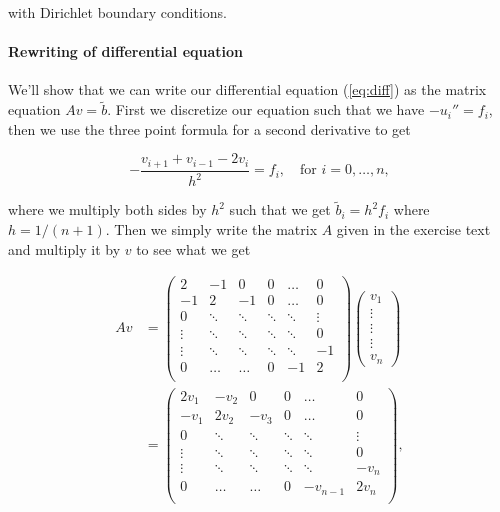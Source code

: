 \documentclass[english, 11pt]{article}
\begin{document}
with Dirichlet boundary conditions. 

\paragraph{Rewriting of differential equation}
We'll show that we can write our differential equation (\ref{eq:diff}) as the matrix equation $ Av = \tilde b$. First we discretize our equation such that we have $-u_i'' = f_i$, then we use the three point formula for a second derivative to get

$$ -\frac{v_{i+1} + v_{i-1} - 2v_i}{h^2} = f_i, \quad \text{for } i=0,\ldots,n, $$

where we multiply both sides by $h^2$ such that we get $ \tilde b_i = h^2 f_i$ where $h = 1/(n+1) $. Then we simply write the matrix $A$ given in the exercise text and multiply it by $v$ to see what we get

\begin{align*}
	Av &=
	\left(\begin{matrix}
		2 & -1 & 0 & 0 &\ldots & 0 \\	
		-1 & 2 & -1 & 0 & \ldots & 0 \\
		0 & \ddots & \ddots & \ddots & \ddots & \vdots \\
		\vdots & \ddots & \ddots & \ddots & \ddots & 0 \\
		\vdots & \ddots & \ddots & \ddots & \ddots & -1 \\
		0 & \ldots & \ldots & 0 & -1 & 2 \\
	\end{matrix}\right)\left(
	\begin{matrix}
		v_1 \\ \vdots\\ \vdots \\ \vdots \\ v_n 
	\end{matrix} \right) \\
	&= \left(\begin{matrix}
		2v_1 & -v_2 & 0 & 0 &\ldots & 0 \\	
		-v_1 & 2v_2 & -v_3 & 0 & \ldots & 0 \\
		0 & \ddots & \ddots & \ddots & \ddots & \vdots \\
		\vdots & \ddots & \ddots & \ddots & \ddots & 0 \\
		\vdots & \ddots & \ddots & \ddots & \ddots & -v_n \\
		0 & \ldots & \ldots & 0 & -v_{n-1} & 2v_n \\
	\end{matrix}\right),
\end{align*}
\end{document}
